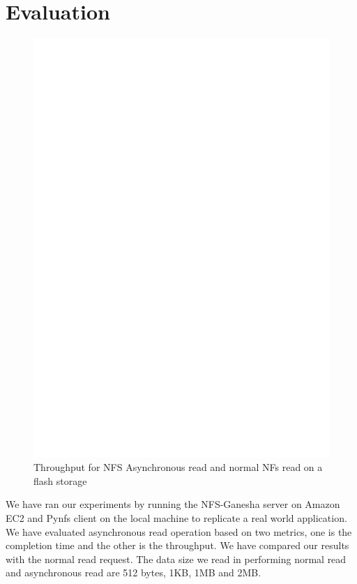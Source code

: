 \section{Evaluation}
\label{sec:Evaluation}

\begin{figure}
\centering
\includegraphics[scale=0.6]{figures/performancesequence.eps}
\caption{Throughput for NFS Asynchronous read and normal NFs read on a flash storage}
\label{fig:performancesequence}
\end{figure}

	We have ran our experiments by running the NFS-Ganesha server on Amazon EC2 and Pynfs client on the local machine to replicate a real world application.  We have evaluated asynchronous read operation based on two metrics, one is the completion time and the other is the throughput. We have compared our results with the normal read request. The data size we read in performing normal read and asynchronous read are 512 bytes, 1KB, 1MB and 2MB. 

